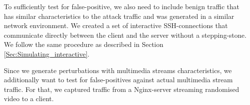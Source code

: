 \documentclass[runningheads,11pt]{llncs}\usepackage[]{graphicx}\usepackage[]{color}
\begin{document}
To sufficiently test for false-positive, we also need to include benign traffic that has similar characteristics to the attack traffic and was generated in a similar network environment. We created a set of interactive SSH-connections that communicate directly between the client and the server without a stepping-stone. We follow the same procedure as described in Section \ref{Sec:Simulating_interactive}.%

Since we generate perturbations with multimedia streams characteristics, we additionally want to test for false-positives against actual multimedia stream traffic. For that, we captured traffic from a Nginx-server streaming randomised video to a client. %



\end{document}

